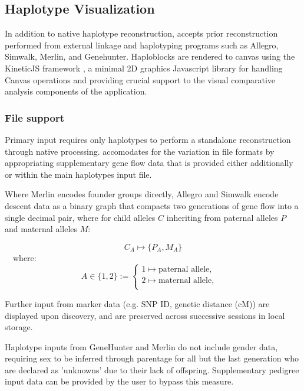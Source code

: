 
\subsection{Haplotype Visualization}

In addition to native haplotype reconstruction, \app accepts prior reconstruction performed from external linkage and haplotyping programs such as Allegro, Simwalk, Merlin, and Genehunter. Haploblocks are rendered to canvas using the KineticJS framework \citep{kineticjs}, a minimal 2D graphics Javascript library for handling Canvas operations and providing crucial support to the visual comparative analysis components of the application.

\subsubsection{File support}

Primary input requires only haplotypes to perform a standalone reconstruction through native processing. \app accomodates for the variation in file formats by appropriating supplementary gene flow data that is provided either additionally or within the main haplotypes input file.

Where Merlin \citep{merlin} encodes founder groups directly, Allegro and Simwalk \citep{allegro,simwalk} encode descent data as a binary graph that compacts two generations of gene flow into a single decimal pair, where for child alleles $C$ inheriting from paternal alleles $P$ and maternal alleles $M$:

\begin{equation}
C_A \mapsto \{P_A,M_A\}
\end{equation}\
\
where:\
\begin{equation}
A \in \{1,2\} := 
    \begin{cases}
      1 \mapsto \text{paternal allele}, &\\
      2 \mapsto \text{maternal allele}, &\\
    \end{cases}
\end{equation}


Further input from marker data (e.g. SNP ID, genetic distance (cM)) are displayed upon discovery, and are preserved across successive sessions in local storage. 

Haplotype inputs from GeneHunter and Merlin do not include gender data, requiring sex to be inferred through parentage for all but the last generation who are declared as 'unknowns' due to their lack of offspring. Supplementary pedigree input data can be provided by the user to bypass this measure.


